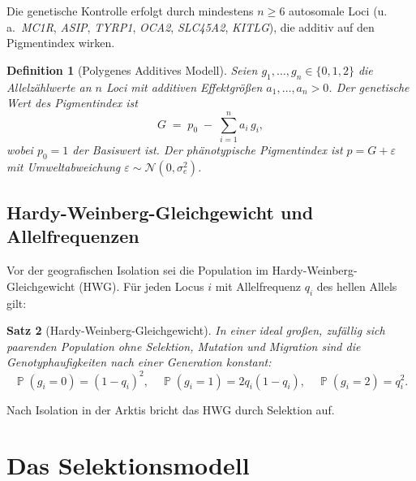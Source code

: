 ﻿\documentclass[12pt,a4paper]{article}
\newtheorem{theorem}{Satz}[section]
\newtheorem{definition}[theorem]{Definition}
\theoremstyle{remark}
\DeclareMathOperator{\Prob}{\mathbb{P}}
\begin{document}
Die genetische Kontrolle erfolgt durch mindestens $n \geq 6$ autosomale Loci
(u.\,a.\ \textit{MC1R}, \textit{ASIP}, \textit{TYRP1}, \textit{OCA2},
\textit{SLC45A2}, \textit{KITLG}), die additiv auf den Pigmentindex wirken.

\begin{definition}[Polygenes Additives Modell]
\label{def:polygenisch}
Seien $g_1, \ldots, g_n \in \{0, 1, 2\}$ die Allelz\"{a}hlwerte an $n$ Loci
mit additiven Effektgr\"{o}\ss{}en $a_1, \ldots, a_n > 0$. Der genetische Wert
des Pigmentindex ist
\[
  G \;=\; p_0 \;-\; \sum_{i=1}^n a_i \, g_i,
\]
wobei $p_0 = 1$ der Basiswert ist. Der ph\"{a}notypische Pigmentindex ist
$p = G + \varepsilon$ mit Umweltabweichung $\varepsilon \sim \mathcal{N}(0,\sigma_e^2)$.
\end{definition}

\subsection{Hardy-Weinberg-Gleichgewicht und Allelfrequenzen}

Vor der geografischen Isolation sei die Population im
Hardy-Weinberg-Gleichgewicht (HWG). F\"{u}r jeden Locus $i$ mit
Allelfrequenz $q_i$ des hellen Allels gilt:

\begin{theorem}[Hardy-Weinberg-Gleichgewicht]
In einer ideal gro\ss{}en, zuf\"{a}llig sich paarenden Population ohne Selektion,
Mutation und Migration sind die Genotyphaufigkeiten nach einer Generation
konstant:
\[
  \Prob(g_i = 0) = (1-q_i)^2, \quad
  \Prob(g_i = 1) = 2q_i(1-q_i), \quad
  \Prob(g_i = 2) = q_i^2.
\]
\end{theorem}

Nach Isolation in der Arktis bricht das HWG durch Selektion auf.

\section{Das Selektionsmodell}
\label{sec:selektion}
\end{document}
